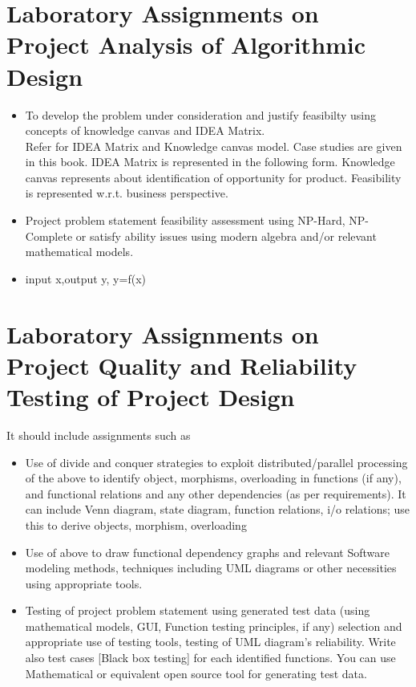 \documentclass[oneside,a4paper,12pt]{book}
\begin{document}
\begin{enumerate}
\begin{itemize}
\begin{appendices}
\chapter{Laboratory Assignments on Project Analysis of Algorithmic Design}
\begin{itemize}
\item To develop the problem under consideration and justify feasibilty using
concepts of knowledge canvas and IDEA Matrix.\\
Refer \cite{innovationbook} for IDEA Matrix and Knowledge canvas model. Case studies are given in this book. IDEA Matrix is represented in the following form. Knowledge canvas represents about identification  of opportunity for product. Feasibility is represented w.r.t. business perspective.\\ 




\item Project problem statement feasibility assessment using NP-Hard, NP-Complete or satisfy ability issues using modern algebra and/or relevant mathematical models.
\item input x,output y, y=f(x)
\end{itemize}

\chapter{Laboratory Assignments on Project Quality and Reliability Testing of Project Design}

It should include assignments such as
\begin{itemize}
\item Use of divide and conquer strategies to exploit distributed/parallel processing of the above to identify object, morphisms, overloading in functions (if any), and functional relations and any other dependencies (as per requirements).
             It can include Venn diagram, state diagram, function relations, i/o relations; use this to derive objects, morphism, overloading

\item Use of above to draw functional dependency graphs and relevant Software modeling methods, techniques
including UML diagrams or other necessities using appropriate tools.
\item Testing of project problem statement using generated test data (using mathematical models, GUI, Function testing principles, if any) selection and appropriate use of testing tools, testing of UML diagram's reliability. Write also test cases [Black box testing] for each identified functions. 
You can use Mathematical or equivalent open source tool for generating test data. 


\end{itemize}
\end{appendices}
\end{itemize}
\end{enumerate}
\end{document}
